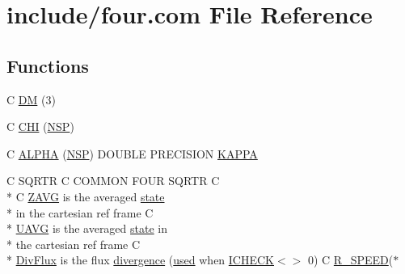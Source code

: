 \hypertarget{four_8com}{\section{include/four.com File Reference}
\label{four_8com}
}
\subsection*{Functions}
\begin{DoxyCompactItemize}
\item 
C \hyperlink{four_8com_a2ed08ad5e03481ea7d3041650c360596}{D\-M} (3)
\item 
C \hyperlink{four_8com_aa1c227f5d1decb30ededbe409e3eaf2b}{C\-H\-I} (\hyperlink{four_8com_aa0cef1d162909c91ecc4ab6954d16e82}{N\-S\-P})
\item 
C \hyperlink{four_8com_a7f8607214bb14f49f4a8c5305414883c}{A\-L\-P\-H\-A} (\hyperlink{four_8com_aa0cef1d162909c91ecc4ab6954d16e82}{N\-S\-P}) D\-O\-U\-B\-L\-E P\-R\-E\-C\-I\-S\-I\-O\-N \hyperlink{four_8com_a6742b6884a0c5a19eb85277ca4dd8d1b}{K\-A\-P\-P\-A}
\item 
C S\-Q\-R\-T\-R C C\-O\-M\-M\-O\-N F\-O\-U\-R S\-Q\-R\-T\-R C \\*
C \hyperlink{three_8com_a63efc6c7080809fef3845bb143f55d41}{Z\-A\-V\-G} is the averaged \hyperlink{merkle_8com_a0ca46ab387e5b2d25720de7e533a6180}{state} \\*
in the cartesian ref frame C \\*
\hyperlink{three_8com_ad59e2d047908ce4ed3fc820d45a326fb}{U\-A\-V\-G} is the averaged \hyperlink{merkle_8com_a0ca46ab387e5b2d25720de7e533a6180}{state} in \\*
the cartesian ref frame C \\*
\hyperlink{three_8com_a540efd196c8ba8ffacd2054d7cd37c3d}{Div\-Flux} is the flux \hyperlink{four_8com_aa8109183081ed7a5366245e0f0539abd}{divergence} (\hyperlink{streamplasma_8com_ae33ecc71599b4338146f31d68e60c328}{used} when \hyperlink{flags_8com_a820fad8822140443f9e99a14c76dc711}{I\-C\-H\-E\-C\-K}$<$$>$ 0) C \hyperlink{three_8com_ab9b65ce69bcdbe659e8abbf2992e665d}{R\-\_\-\-S\-P\-E\-E\-D}($\ast$
\end{DoxyCompactItemize}
